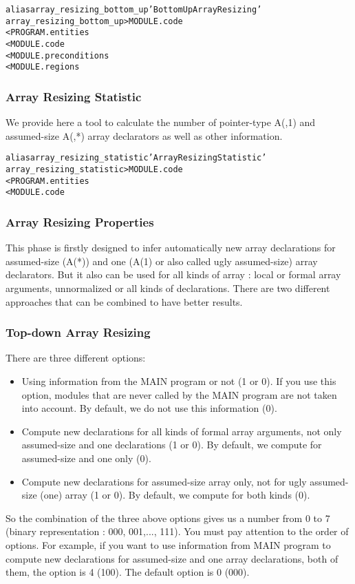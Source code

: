 \documentclass[a4paper]{report}
\newenvironment{PipsMake}{\begin{alltt}}{\end{alltt}}
\begin{document}
\begin{PipsMake}
alias array_resizing_bottom_up 'Bottom Up Array Resizing'
array_resizing_bottom_up         > MODULE.code
        < PROGRAM.entities
        < MODULE.code
        < MODULE.preconditions
        < MODULE.regions
\end{PipsMake}

\subsubsection{Array Resizing Statistic}

We provide here a tool to calculate the number of pointer-type A(,1) and
assumed-size A(,*) array declarators as well as other information.

\begin{PipsMake}
alias array_resizing_statistic 'Array Resizing Statistic'
array_resizing_statistic   > MODULE.code
        < PROGRAM.entities
        < MODULE.code
\end{PipsMake}

\subsubsection{Array Resizing Properties}

This phase is firstly designed to infer automatically new array
declarations for assumed-size (A(*)) and one (A(1) or also called ugly
assumed-size) array declarators. But
it also can be used for all kinds of array : local or formal array
arguments, unnormalized or all kinds of declarations. There are two
different approaches that can be combined to have better results.

\subsubsection*{Top-down Array Resizing}
There are three different options:
\begin{itemize}
\item Using information from the MAIN program or not (1 or 0). If you use
  this option, modules that are never called by the MAIN program are not
  taken into account. By default, we do not use this information (0).
\item Compute new declarations for all kinds of formal array arguments,
  not only assumed-size and one declarations (1 or 0). By default, we
  compute for assumed-size and one only (0).
\item Compute new declarations for assumed-size array only, not for ugly
  assumed-size (one) array (1 or 0). By default, we compute for both kinds
  (0).
\end{itemize}
So the combination of the three above options gives us a number from 0 to
7 (binary representation : 000, 001,..., 111). You must pay attention to
the order of options. For example, if you want to use information from
MAIN program to compute new declarations for assumed-size and one array
declarations, both of them, the option is 4 (100). The default option is 0
(000).
\end{document}
